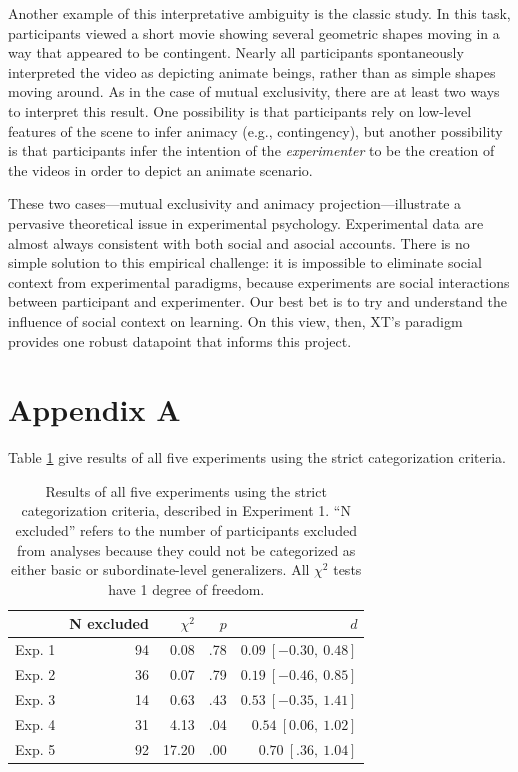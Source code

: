 \documentclass[man]{apa2}
\begin{document}
Another example of this interpretative ambiguity is the classic  study. In this task, participants viewed a short movie showing several geometric shapes moving in a way that appeared to be contingent. Nearly all participants spontaneously interpreted the video as depicting animate beings, rather than as simple shapes moving around. As in the case of mutual exclusivity, there are at least two ways to interpret this result. One possibility is that participants rely on low-level features of the scene to infer animacy (e.g., contingency), but another possibility is that participants infer the intention of the \emph{experimenter} to be the creation of the videos in order to depict an animate scenario.

These two cases---mutual exclusivity and animacy projection---illustrate a pervasive theoretical issue in experimental psychology. Experimental data are almost always consistent with both social and asocial accounts. There is no simple solution to this empirical challenge: it is impossible to eliminate social context from experimental paradigms, because experiments are social interactions between participant and experimenter. Our best bet is to try and understand the influence of social context on learning. On this view, then, XT's paradigm provides one robust datapoint that informs this project.

\section{Appendix A}

Table \ref{tab:strictResults} give results of all five experiments using the strict categorization criteria.

\begin{table}[h]
\centering
\begin{tabular}{rrrrr}
 \hline
 & N excluded & $\chi^2$ & $p$ & $d$ \\ 
 \hline
Exp. 1 & 94 & 0.08 & .78 & $0.09\ [-0.30,\ 0.48]$\\ 
Exp. 2 & 36 & 0.07 & .79 & $0.19\ [-0.46,\ 0.85]$ \\ 
Exp. 3 & 14 & 0.63 & .43 & $0.53\ [-0.35,\ 1.41]$ \\ 
Exp. 4 & 31 & 4.13 & .04 & $0.54\ [0.06,\ 1.02]$\\ 
Exp. 5 & 92 & 17.20 &  .00 & $0.70\ [.36,\ 1.04]$\\ 
 \hline
\end{tabular}
\caption{\label{tab:strictResults} Results of all five experiments using the strict categorization criteria, described in Experiment 1. ``N excluded'' refers to the number of participants excluded from analyses because they could not be categorized as either basic or subordinate-level generalizers. All $\chi^2$ tests have 1 degree of freedom.}
\end{table}
\end{document}
